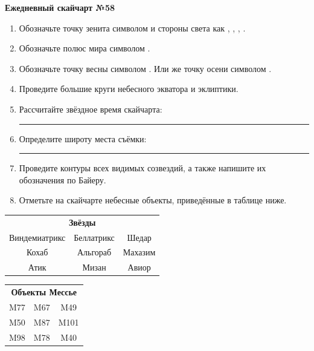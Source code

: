 \documentclass{./SAS-class-skygen}
\begin{document}
    
    
    
	\begin{center}
		\large\textbf{Ежедневный скайчарт №58}
	\end{center}

	\begin{enumerate}
		\item Обозначьте точку зенита символом  и стороны света как , , , .
		\item Обозначьте полюс мира символом .
		\item Обозначьте точку весны символом \Aries. Или же точку осени символом \Libra.
		\item Проведите большие круги небесного экватора и эклиптики.
		\item Рассчитайте звёздное время скайчарта: \rule{2cm}{0.4pt}
		\item Определите широту места съёмки: \rule{2cm}{0.4pt}
		\item Проведите контуры всех видимых созвездий, а также напишите их обозначения по Байеру.
		\item Отметьте на скайчарте небесные объекты, приведённые в таблице ниже.
	\end{enumerate}
	
    \vspace{0.5cm}

    \begin{table}[h!]
    \centering
    \begin{tabular}{ccc}
    \multicolumn{3}{c}{\textbf{Звёзды}} \\ Виндемиатрикс & Беллатрикс & Шедар \\
Кохаб & Альгораб & Махазим \\
Атик & Мизан & Авиор \\

\end{tabular}
    \hfill
    \begin{tabular}{ccc}
    \multicolumn{3}{c}{\textbf{Объекты Мессье}} \\ M77 & M67 & M49 \\
M50 & M87 & M101 \\
M98 & M78 & M40 \\

\end{tabular}
    \end{table}
	
\end{document}
